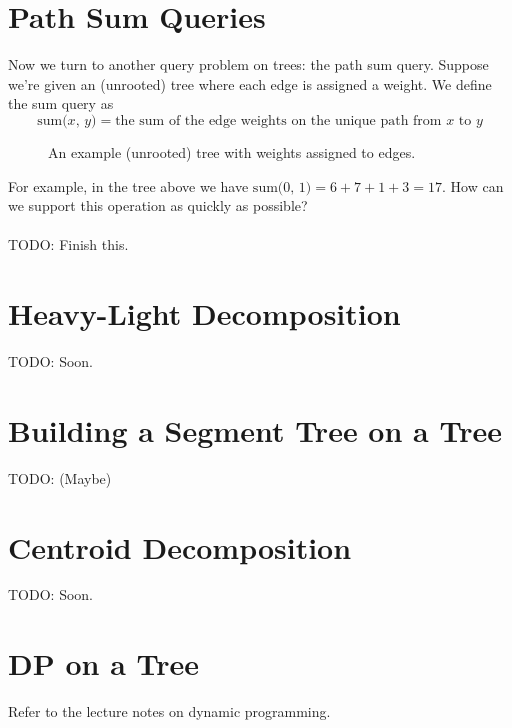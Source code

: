 \documentclass[11pt]{article}
\theoremstyle{plain}
\theoremstyle{definition}
\begin{document}
\section{Path Sum Queries}
Now we turn to another query problem on trees: the path sum query. Suppose we're given an (unrooted) tree where each edge is assigned a weight. We define the sum query as\\
$$\boxed{\text{sum($x$, $y$)} = \text{the sum of the edge weights on the unique path from $x$ to $y$}}$$
\begin{figure}[!ht]
\caption{An example (unrooted) tree with weights assigned to edges.}
\centering
{}
\end{figure}
\newpage
\noindent
For example, in the tree above we have $\boxed{\text{sum($0$, $1$)} = 6 + 7 + 1 + 3 = 17}$. How can we support this operation as quickly as possible?
\\\\
\noindent
TODO: Finish this.

\section{Heavy-Light Decomposition}
TODO: Soon.
\section{Building a Segment Tree on a Tree}
TODO: (Maybe)
\section{Centroid Decomposition}
TODO: Soon.
\section{DP on a Tree}
Refer to the lecture notes on dynamic programming.
\end{document}
